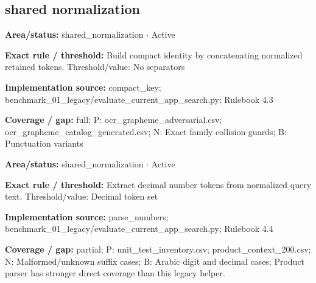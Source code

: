 \subsection*{shared normalization}
\begin{tcolorbox}[enhanced,breakable,colback=white,colframe=Muted!45,boxrule=0.45pt,arc=1.5pt,left=6pt,right=6pt,top=5pt,bottom=5pt,title={\texttt{SH-NORM-COMPACT-03}},title after break={\texttt{SH-NORM-COMPACT-03}\ (continued)},fonttitle=\headingfont\bfseries\color{Navy},coltitle=Navy]
\textbf{Area/status:} shared\_\allowbreak{}normalization $\boldsymbol{\cdot}$ Active\par
\smallskip
\textbf{Exact rule / threshold:} Build compact identity by concatenating normalized retained tokens. Threshold/\allowbreak{}value: No separators\par
\smallskip
\textbf{Implementation source:} compact\_\allowbreak{}key; benchmark\_\allowbreak{}01\_\allowbreak{}legacy/\allowbreak{}evaluate\_\allowbreak{}current\_\allowbreak{}app\_\allowbreak{}search.py; Rulebook 4.3\par
\smallskip
\textbf{Coverage / gap:} full; P: ocr\_\allowbreak{}grapheme\_\allowbreak{}adversarial.csv; ocr\_\allowbreak{}grapheme\_\allowbreak{}catalog\_\allowbreak{}generated.csv; N: Exact family collision guards; B: Punctuation variants
\end{tcolorbox}
\begin{tcolorbox}[enhanced,breakable,colback=white,colframe=Muted!45,boxrule=0.45pt,arc=1.5pt,left=6pt,right=6pt,top=5pt,bottom=5pt,title={\texttt{SH-NORM-NUMBER-06}},title after break={\texttt{SH-NORM-NUMBER-06}\ (continued)},fonttitle=\headingfont\bfseries\color{Navy},coltitle=Navy]
\textbf{Area/status:} shared\_\allowbreak{}normalization $\boldsymbol{\cdot}$ Active\par
\smallskip
\textbf{Exact rule / threshold:} Extract decimal number tokens from normalized query text. Threshold/\allowbreak{}value: Decimal token set\par
\smallskip
\textbf{Implementation source:} parse\_\allowbreak{}numbers; benchmark\_\allowbreak{}01\_\allowbreak{}legacy/\allowbreak{}evaluate\_\allowbreak{}current\_\allowbreak{}app\_\allowbreak{}search.py; Rulebook 4.4\par
\smallskip
\textbf{Coverage / gap:} partial; P: unit\_\allowbreak{}test\_\allowbreak{}inventory.csv; product\_\allowbreak{}context\_\allowbreak{}200.csv; N: Malformed/\allowbreak{}unknown suffix cases; B: Arabic digit and decimal cases; Product parser has stronger direct coverage than this legacy helper.
\end{tcolorbox}
